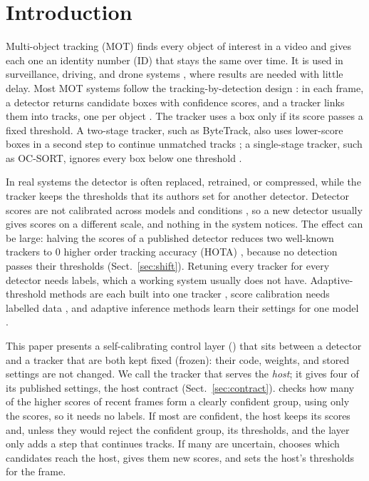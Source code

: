 \section{Introduction}\label{sec:intro}

Multi-object tracking (MOT) finds every object of interest in a video and gives each one an
identity number (ID) that stays the same over time. It is used in surveillance, driving, and drone
systems \cite{zhu2022visdrone,wu2022uavsurvey}, where results are needed with little delay. Most
MOT systems follow the tracking-by-detection design \cite{adzemovic2026survey}: in each frame, a
detector returns candidate boxes with confidence scores, and a tracker links them into tracks, one
per object \cite{bewley2016sort,zhang2022bytetrack,cao2023ocsort}. The tracker uses a box only if
its score passes a fixed threshold. A two-stage tracker, such as ByteTrack, also uses lower-score
boxes in a second step to continue unmatched tracks \cite{zhang2022bytetrack}; a single-stage
tracker, such as OC-SORT, ignores every box below one threshold \cite{cao2023ocsort}.

In real systems the detector is often replaced, retrained, or compressed, while the tracker keeps
the thresholds that its authors set for another detector. Detector scores are not calibrated across
models and conditions \cite{kuppers2020detcalib}, so a new detector usually gives scores on a
different scale, and nothing in the system notices. The effect can be large: halving the scores of
a published detector reduces two well-known trackers to 0 higher order tracking accuracy (HOTA)
\cite{luiten2021hota}, because no detection passes their thresholds (Sect.~\ref{sec:shift}).
Retuning every tracker for every detector needs labels, which a working system usually does not
have. Adaptive-threshold methods are each built into one tracker
\cite{ma2023adaptivebytetrack,shim2024adaptrack,act2026adaptive}, score calibration needs
labelled data \cite{kuppers2020detcalib}, and adaptive inference methods learn their settings for
one model \cite{han2022dynamic,jiang2018chameleon}.

This paper presents a self-calibrating control layer (\scl{}) that sits between a detector and a
tracker that are both kept fixed (frozen): their code, weights, and stored settings are not
changed. We call the tracker that \scl{} serves the \emph{host}; it gives \scl{} four of its
published settings, the host contract (Sect.~\ref{sec:contract}). \scl{} checks how many of the
higher scores of recent frames form a clearly confident group, using only the scores, so it needs
no labels. If most are confident, the host keeps its scores and, unless they would reject the
confident group, its thresholds, and the layer only adds a step that continues tracks. If many are uncertain, \scl{} chooses which candidates reach the host, gives
them new scores, and sets the host's thresholds for the frame.

